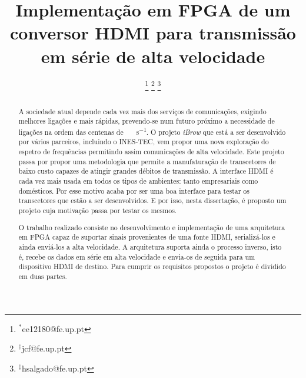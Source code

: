 \documentclass[a4paper]{IEEEtran}
\begin{document}
\title{Implementação em FPGA de um conversor HDMI para transmissão em série de alta velocidade}


\author{%
\thanks{$^*$ee12180@fe.up.pt}
%
\thanks{$^\dag$jcf@fe.up.pt}
%
\thanks{$^\ddag$hsalgado@fe.up.pt}
}
\maketitle


\begin{abstract}
A sociedade atual depende cada vez mais dos serviços de comunicações, exigindo melhores ligações e mais rápidas, prevendo-se num futuro próximo a necessidade de ligações na ordem das centenas de \SI{}{\giga\bit\per\second}. O projeto \textit{iBrow} que está a ser desenvolvido por vários parceiros, incluindo o INES-TEC, vem propor uma nova exploração do espetro de frequências permitindo assim comunicações de alta velocidade. Este projeto passa por propor uma metodologia que permite a manufaturação de transcetores de baixo custo capazes de atingir grandes débitos de transmissão. A interface HDMI é cada vez mais usada em todos os tipos de ambientes: tanto empresariais como domésticos. Por esse motivo acaba por ser uma boa interface para testar os transcetores que estão a ser desenvolvidos. E por isso, nesta dissertação, é proposto um projeto cuja motivação passa por testar os mesmos. 

O trabalho realizado consiste no desenvolvimento e implementação de  uma arquitetura em FPGA capaz de suportar sinais provenientes de uma fonte HDMI, serializá-los e ainda enviá-los a alta velocidade. A arquitetura suporta ainda o processo inverso, isto é, recebe os dados em série em alta velocidade e envia-os de seguida para um dispositivo HDMI de destino. Para cumprir os requisitos propostos o projeto é dividido em duas partes.
\end{abstract}

\end{document}
